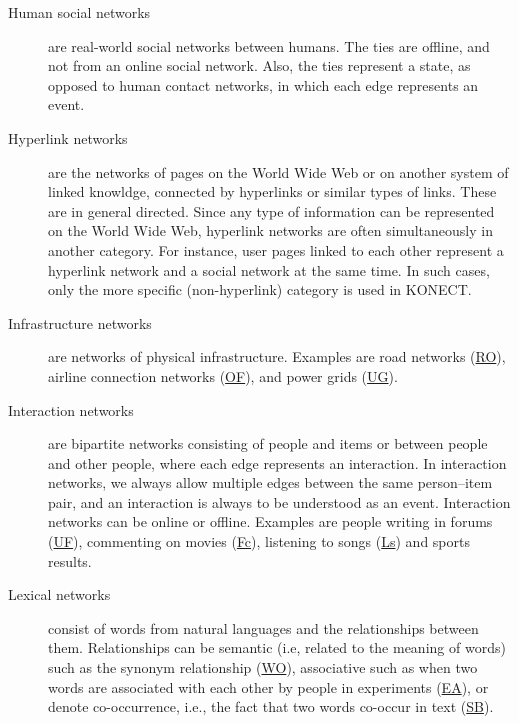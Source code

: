\documentclass{article}
\begin{document}
\begin{description}
\item[Human social networks] are real-world social networks between
  humans.   The ties are offline,
  and not from an online social network.  Also, the ties represent a
  state, as opposed to human contact networks, in which each edge
  represents an event.

\item[Hyperlink networks] are the
  networks  of pages on the World Wide Web
  or on another system of linked knowldge,
  connected by hyperlinks or similar types of links.  These are in general directed.  Since any
  type of information can be represented on the World Wide Web,
  hyperlink networks are often simultaneously in another category.  For
  instance, user pages linked to each other represent a hyperlink
  network and a social network at the same time.  In such cases, only
  the more specific (non-hyperlink) category is used in KONECT.

\item[Infrastructure networks] are networks of physical infrastructure.  
  Examples are road networks
  (\href{http://konect.cc/networks/roadNet-CA/}{\textsf{RO}}), airline
  connection networks
  (\href{http://konect.cc/networks/opsahl-openflights/}{\textsf{OF}}), 
  and power grids
  (\href{http://konect.cc/networks/opsahl-powergrid/}{\textsf{UG}}).  
  
\item[Interaction networks] are bipartite networks consisting of people
  and items or between people and other people, where each edge represents an interaction. 
  In interaction networks, we always allow multiple edges between the
  same person--item pair, and an interaction is always to be understood as an event. 
  Interaction networks can be online or offline.
  Examples are
  people writing in forums
  (\href{http://konect.cc/networks/opsahl-ucforum/}{\textsf{UF}}),
  commenting on movies
  (\href{http://konect.cc/networks/filmtipset_comment/}{\textsf{Fc}}),
  listening to songs
  (\href{http://konect.cc/networks/lastfm_song/}{\textsf{Ls}})
  and sports results. 

\item[Lexical networks] consist of words from natural 
   languages and the relationships between
  them.  Relationships can be semantic (i.e, related to the meaning of
  words) such as the synonym relationship
  (\href{http://konect.cc/networks/wordnet-words/}{\textsf{WO}}),
  associative such as when two words are associated with each other by
  people in experiments
  (\href{http://konect.cc/networks/eat/}{\textsf{EA}}), or denote
  co-occurrence, i.e., the fact that two words co-occur in text
  (\href{http://konect.cc/networks/lasagne-spanishbook/}{\textsf{SB}}).


\end{description}
\end{document}
